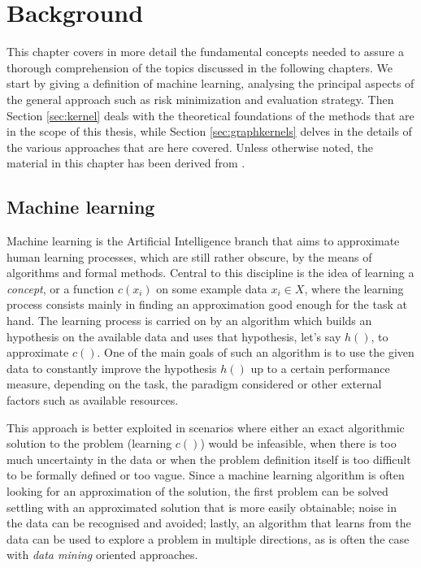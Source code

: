 
\chapter{Background} %
This chapter covers in more detail the fundamental concepts needed to assure a
thorough comprehension of the topics discussed in the following chapters.
We start by giving a definition of machine learning, analysing the 
principal aspects of the general approach such as risk minimization and evaluation
strategy.
Then Section \ref{sec:kernel} deals with the theoretical foundations of the 
methods that are in the scope of this thesis, while Section \ref{sec:graphkernels}
delves in the details of the various approaches that are here covered.
Unless otherwise noted, the material in this chapter has been derived
from \cite{nnavarin, rtesselli}.

\label{Chapter2} %

\section{Machine learning}

Machine learning is the Artificial Intelligence branch that aims
to approximate human learning processes, which are still rather obscure,
by the means of algorithms and formal methods.
Central to this discipline is the idea of learning a \emph{concept}, or a function
$c(x_i)$ on some example data $x_i \in X$, where the learning process consists
mainly in finding an approximation good enough for the task at hand.
The learning process is carried on by an algorithm which builds an hypothesis
on the available data and uses that hypothesis, let's say $h()$,  to approximate
$c()$.
One of the main goals of such an algorithm is to use the given data to constantly
improve the hypothesis $h()$ up to a certain performance measure, depending
on the task, the paradigm considered or other external factors such as available
resources.

This approach is better exploited in scenarios where either an exact
algorithmic solution to the problem (learning $c()$) would be infeasible, when
there is too much uncertainty in the data or when the problem definition itself
is too difficult to be formally defined or too vague.
Since a machine learning algorithm is often looking for an approximation of the 
solution, the first problem can be solved settling with an approximated
solution that is more easily obtainable; noise in the data can be recognised and avoided;
lastly, an algorithm that learns from the data can be used to explore a problem in multiple
directions, as is often the case with \emph{data mining} oriented approaches.

